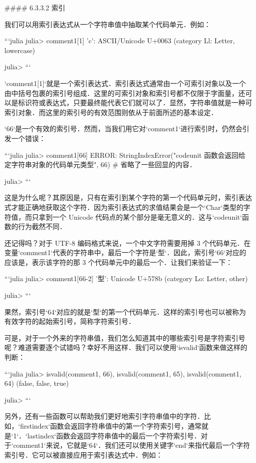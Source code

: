 #### 6.3.3.2 索引

我们可以用索引表达式从一个字符串值中抽取某个代码单元．例如：

```julia
julia> comment1[1]
'c': ASCII/Unicode U+0063 (category Ll: Letter, lowercase)

julia> 
```

`comment1[1]`就是一个索引表达式．索引表达式通常由一个可索引对象以及一个由中括号包裹的索引号组成．这里的可索引对象和索引号都不仅限于字面量，还可以是标识符或表达式，只要最终能代表它们就可以了．显然，字符串值就是一种可索引对象．而这里的索引号的有效范围则依从于前面所述的基本设定．

`66`是一个有效的索引号．然而，当我们用它对`comment1`进行索引时，仍然会引发一个错误：

```julia
julia> comment1[66]
ERROR: StringIndexError("codeunit 函数会返回给定字符串对象的代码单元类型", 66)
# 省略了一些回显的内容．

julia> 
```

这是为什么呢？其原因是，只有在索引到某个字符的第一个代码单元时，索引表达式才能正确地获取这个字符．因为索引表达式的求值结果会是一个`Char`类型的字符值，而只拿到一个 Unicode 代码点的某个部分是毫无意义的．这与`codeunit`函数的行为截然不同．

还记得吗？对于 UTF-8 编码格式来说，一个中文字符需要用掉 3 个代码单元．在变量`comment1`代表的字符串中，最后一个字符是`型`．因此，索引号`66`对应的应该是，表示该字符的那 3 个代码单元中的最后一个．让我们来验证一下：

```julia
julia> comment1[66-2]
'型': Unicode U+578b (category Lo: Letter, other)

julia> 
```

果然，索引号`64`对应的就是`型`的第一个代码单元．这样的索引号也可以被称为有效字符的起始索引号，简称字符索引号．

可是，对于一个外来的字符串值，我们怎么知道其中的哪些索引号是字符索引号呢？难道需要逐个试错吗？幸好不用这样．我们可以使用`isvalid`函数来做这样的判断：

```julia
julia> isvalid(comment1, 66), isvalid(comment1, 65), isvalid(comment1, 64)
(false, false, true)

julia> 
```

另外，还有一些函数可以帮助我们更好地索引字符串值中的字符．比如，`firstindex`函数会返回字符串值中的第一个字符索引号，通常就是`1`．`lastindex`函数会返回字符串值中的最后一个字符索引号．对于`comment1`来说，它就是`64`．我们还可以使用关键字`end`来指代最后一个字符索引号．它可以被直接应用于索引表达式中．例如：

